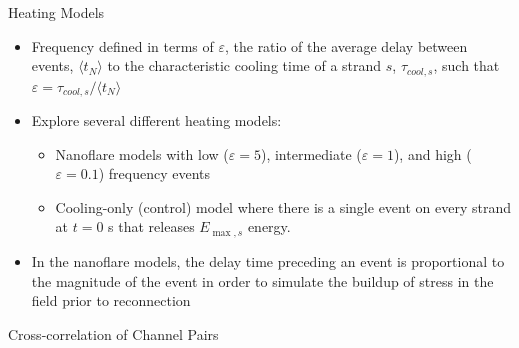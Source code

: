 \documentclass[final]{beamer}
\begin{document}
\begin{frame}
\begin{columns}[T]
\begin{column}{0.49\linewidth}
\begin{block}{Heating Models}
\begin{itemize}
            \item Frequency defined in terms of $\varepsilon$, the ratio of the average delay between events, $\langle t_N\rangle$ to the characteristic cooling time of a strand $s$, $\tau_{cool,s}$, such that $\varepsilon = \tau_{cool,s}/\langle t_N\rangle$
            \item Explore several different heating models:
            \begin{itemize}
                \item Nanoflare models with low ($\varepsilon=5$), intermediate ($\varepsilon=1$), and high ($\varepsilon=0.1$) frequency events
                \item Cooling-only (control) model where there is a single event on every strand at $t=0$ s that releases $E_{\max,s}$ energy.
            \end{itemize}
            \item In the nanoflare models, the delay time preceding an event is proportional to the magnitude of the event in order to simulate the buildup of stress in the field prior to reconnection \citep[e.g. see][]{cargill_active_2014,barnes_inference_2016-1}
        \end{itemize}
    \end{block}
    \begin{block}{Cross-correlation of Channel Pairs}
        \begin{columns}[c]
            \begin{column}{0.49\columnwidth}
            \begin{figure}
                \subfigure{%
}
\end{figure}
\end{column}
\end{columns}
\end{block}
\end{column}
\end{columns}
\end{frame}
\end{document}
